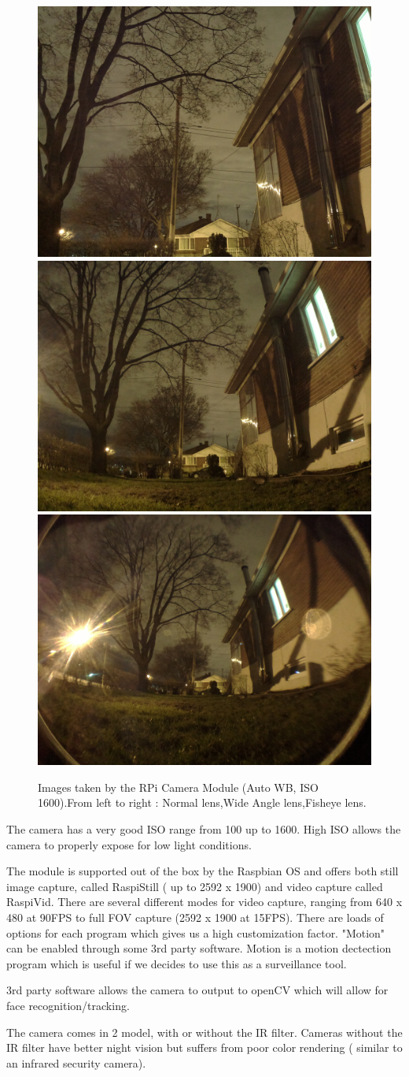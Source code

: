 \begin{figure}
	\centering
	\caption{Images taken by the RPi Camera Module (Auto WB, ISO 1600).From left to right : Normal lens,Wide Angle lens,Fisheye lens.}
	\includegraphics[width=.32\textwidth]{gfx/camcapture/normal.jpg}
	\includegraphics[width=.32\textwidth]{gfx/camcapture/wideangle.jpg}
	\includegraphics[width=.32\textwidth]{gfx/camcapture/fisheye.jpg}
	\label{fig:RPi-Camera-Capture}
\end{figure}
\begin{multicols}{2}

 		The camera has a very good ISO range from 100 up to 1600. High ISO allows the camera to properly expose for low light conditions.



		The module is supported out of the box by the Raspbian OS and offers both still image capture, called RaspiStill ( up to 2592 x 1900) and video capture called RaspiVid. There are several different modes for video capture, ranging from 640 x 480 at 90FPS to full FOV capture (2592 x 1900 at 15FPS).  There are loads of options for each program which gives us a high customization factor. "Motion" can be enabled through some 3rd party software. Motion is a motion dectection program which is useful if we decides to use this as a surveillance tool.

		3rd party software allows the camera to output to openCV which will allow for face recognition/tracking.

		The camera comes in 2 model, with or without the IR filter. Cameras without the IR filter have better night vision but suffers from poor color rendering ( similar to an infrared security camera). 

	
\end{multicols}
